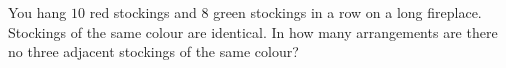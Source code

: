 You hang $10$ red stockings and $8$ green stockings in a row on a long fireplace. Stockings of the same colour are identical. In how many arrangements are there no three adjacent stockings of the same colour?

